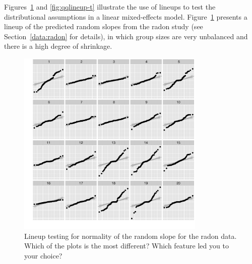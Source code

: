 \documentclass[12pt]{article} %
\begin{document}
Figures~\ref{fig:qqlineup-1} and \ref{fig:qqlineup-t} illustrate the use of lineups to test the distributional assumptions in a linear mixed-effects model. Figure~\ref{fig:qqlineup-1} presents a lineup of the predicted random slopes from the radon study (see Section~\ref{data:radon} for details), in which group sizes are very unbalanced and there is a high degree of shrinkage.
\begin{figure}[hbt]
	\centering
	\includegraphics[width=0.8\textwidth]{radonqqb2-3-10.pdf}
	\caption{\label{fig:qqlineup-1}
	Lineup testing  for normality of the random slope for the radon data. Which of the plots is the most different? Which feature led you to your choice? }
\end{figure}
\end{document}
